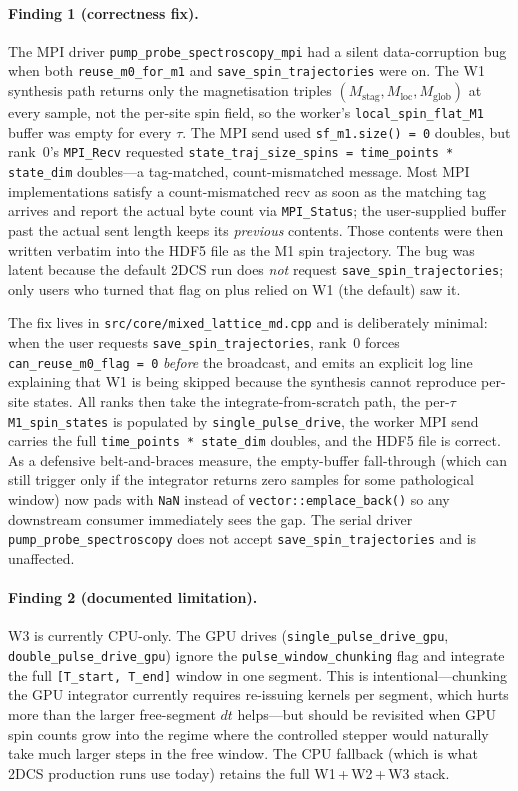 \documentclass[11pt,letterpaper]{article}
\begin{document}
\paragraph{Finding 1 (\textbf{correctness fix}).}  The MPI driver
\texttt{pump\_probe\_spectroscopy\_mpi} had a silent data-corruption
bug when both \texttt{reuse\_m0\_for\_m1} and
\texttt{save\_spin\_trajectories} were on.  The W1 synthesis path
returns only the magnetisation triples
$(M_{\mathrm{stag}}, M_{\mathrm{loc}}, M_{\mathrm{glob}})$ at every
sample, not the per-site spin field, so the worker's
\texttt{local\_spin\_flat\_M1} buffer was empty for every $\tau$.
The MPI send used \texttt{sf\_m1.size() = 0} doubles, but
rank~0's \texttt{MPI\_Recv} requested
\texttt{state\_traj\_size\_spins = time\_points * state\_dim}
doubles---a tag-matched, count-mismatched message.  Most MPI
implementations satisfy a count-mismatched recv as soon as the
matching tag arrives and report the actual byte count via
\texttt{MPI\_Status}; the user-supplied buffer past the actual
sent length keeps its \emph{previous} contents.  Those contents
were then written verbatim into the HDF5 file as the M1 spin
trajectory.  The bug was latent because the default 2DCS run does
\emph{not} request \texttt{save\_spin\_trajectories}; only users
who turned that flag on plus relied on W1 (the default) saw it.

The fix lives in \texttt{src/core/mixed\_lattice\_md.cpp} and is
deliberately minimal: when the user requests
\texttt{save\_spin\_trajectories}, rank~0 forces
\texttt{can\_reuse\_m0\_flag = 0} \emph{before} the broadcast, and
emits an explicit log line explaining that W1 is being skipped
because the synthesis cannot reproduce per-site states.  All ranks
then take the integrate-from-scratch path, the per-$\tau$
\texttt{M1\_spin\_states} is populated by
\texttt{single\_pulse\_drive}, the worker MPI send carries the full
\texttt{time\_points * state\_dim} doubles, and the HDF5 file is
correct.  As a defensive belt-and-braces measure, the empty-buffer
fall-through (which can still trigger only if the integrator
returns zero samples for some pathological window) now pads with
\texttt{NaN} instead of \texttt{vector::emplace\_back()} so any
downstream consumer immediately sees the gap.  The serial driver
\texttt{pump\_probe\_spectroscopy} does not accept
\texttt{save\_spin\_trajectories} and is unaffected.

\paragraph{Finding 2 (documented limitation).}  W3 is currently
CPU-only.  The GPU drives (\texttt{single\_pulse\_drive\_gpu},
\texttt{double\_pulse\_drive\_gpu}) ignore the
\texttt{pulse\_window\_chunking} flag and integrate the full
\texttt{[T\_start, T\_end]} window in one segment.  This is
intentional---chunking the GPU integrator currently requires
re-issuing kernels per segment, which hurts more than the larger
free-segment $dt$ helps---but should be revisited when GPU spin
counts grow into the regime where the controlled stepper would
naturally take much larger steps in the free window.  The CPU
fallback (which is what 2DCS production runs use today) retains
the full W1$\,$+$\,$W2$\,$+$\,$W3 stack.
\end{document}
